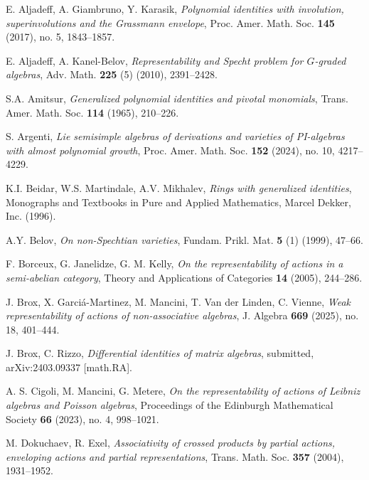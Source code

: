 \documentclass[reqno]{amsart}
\theoremstyle{definition}
\numberwithin{equation}{section}
\numberwithin{theorem}{section}
\begin{document}
\begin{thebibliography}{}

 E. Aljadeff, A. Giambruno, Y. Karasik, {\em Polynomial identities with involution, superinvolutions and the Grassmann envelope}, Proc. Amer. Math. Soc. {\bf 145} (2017), no. 5, 1843--1857.
	
	 E. Aljadeff, A. Kanel-Belov, {\em Representability and Specht problem for $G$-graded algebras}, Adv. Math. {\bf 225} (5) (2010), 2391--2428.

 S.A. Amitsur, {\em Generalized polynomial identities and pivotal monomials}, Trans. Amer. Math. Soc. {\bf 114} (1965), 210--226.

 S. Argenti, {\em Lie semisimple algebras of derivations and varieties of PI-algebras with almost polynomial growth}, Proc. Amer. Math. Soc. \textbf{152} (2024), no. 10, 4217--4229.


 K.I. Beidar, W.S. Martindale, A.V. Mikhalev, \textit{Rings with generalized identities}, Monographs and Textbooks in Pure and Applied Mathematics, Marcel Dekker, Inc. (1996).

 A.Y. Belov, {\em On non-Spechtian varieties}, Fundam. Prikl. Mat. \textbf{5} (1) (1999), 47--66.

 F. Borceux, G. Janelidze, G. M. Kelly, {\em On the representability of actions in a semi-abelian
category}, Theory and Applications of Categories {\bf 14} (2005), 244--286.



 J. Brox, X. Garci\'a-Martinez, M. Mancini, T. Van der Linden, C. Vienne, {\em Weak representability of actions of non-associative algebras}, J. Algebra \textbf{669} (2025), no. 18, 401--444.

 J. Brox, C. Rizzo, {\em Differential identities of matrix algebras}, submitted, arXiv:2403.09337 [math.RA].

 A. S. Cigoli, M. Mancini, G. Metere, {\em On the representability of actions of Leibniz algebras and Poisson algebras}, Proceedings of the Edinburgh Mathematical Society {\bf 66} (2023), no. 4, 998--1021.


 M. Dokuchaev, R. Exel, {\em Associativity of crossed products by partial actions, enveloping actions and partial representations}, Trans. Math. Soc. {\bf 357} (2004), 1931--1952.


\end{thebibliography}
\end{document}
